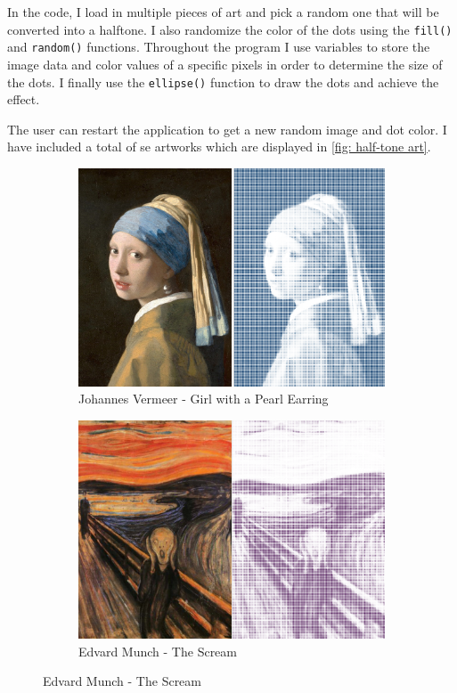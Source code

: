 In the code, I load in multiple pieces of art and pick a random one that will be converted into a halftone. I also randomize the color of the dots using the \texttt{fill()} and \texttt{random()} functions. Throughout the program I use variables to store the image data and color values of a specific pixels in order to determine the size of the dots. I finally use the \texttt{ellipse()} function to draw the dots and achieve the effect.

The user can restart the application to get a new random image and dot color. I have included a total of se artworks which are displayed in \cref{fig: half-tone art}.

\begin{figure}[H]
    \centering
    \begin{subfigure}[b]{0.45\textwidth}
        \centering
        \includegraphics[width=\textwidth]{Figures/day_1/girl_with_the_pearl.png}
        \caption{Johannes Vermeer - Girl with a Pearl Earring}
    \end{subfigure}
    \hspace{1cm}
    \begin{subfigure}[b]{0.45\textwidth}
        \centering

        \includegraphics[width=\textwidth]{Figures/day_1/the_scream.png}
        \caption{Edvard Munch - The Scream}
    \end{subfigure}


\end{figure}
